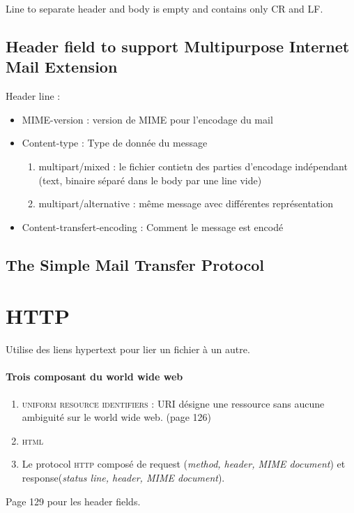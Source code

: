 \documentclass{report}
\begin{document}
Line to separate header and body is empty and contains only CR and LF.

\subsection{Header field to support Multipurpose Internet Mail Extension}
Header line :
\begin{itemize}
    \item MIME-version : version de MIME pour l'encodage du mail
    \item Content-type : Type de donnée du message
        \begin{enumerate}
            \item multipart/mixed : le fichier contietn des parties d'encodage
                indépendant (text, binaire séparé dans le body par une line vide)
            \item multipart/alternative : même message avec différentes représentation
        \end{enumerate}
    \item Content-transfert-encoding : Comment le message est encodé
\end{itemize}

\subsection{The Simple Mail Transfer Protocol}

\section{HTTP}
Utilise des liens hypertext pour lier un fichier à un autre.

\paragraph{Trois composant du world wide web}
\begin{enumerate}
    \item \textsc{uniform resource identifiers} : URI désigne une ressource sans aucune ambiguité 
sur le world wide web. (page 126)
    \item \textsc{html}
    \item Le protocol \textsc{http} composé de request (\textit{method, header, MIME document}) et response(\textit{status line, header, MIME document}).
\end{enumerate}

Page 129 pour les header fields.
\end{document}
